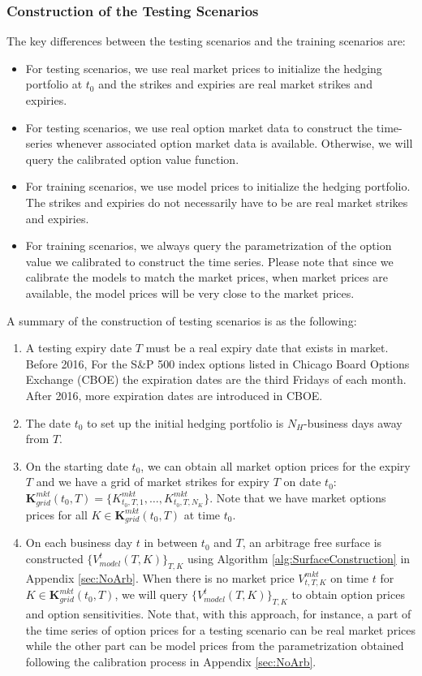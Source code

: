 \documentclass[letterpaper,12pt,titlepage,oneside,final]{book}
\numberwithin{equation}{section}
\theoremstyle{definition}
\begin{document}
\subsubsection{Construction of the Testing Scenarios}
\label{sec:AugTest}
The key differences between the testing scenarios and the training scenarios are:
\begin{itemize}
	\item  For testing scenarios, we use real market prices to initialize the hedging portfolio at $t_0$ and the strikes and expiries are real market strikes and expiries.
	\item  For testing scenarios, we use real option market data to construct the time-series whenever associated  option market data is available. Otherwise, we will query the calibrated option value function.
	\item For training scenarios, we use model prices to initialize the hedging portfolio. The strikes and expiries do not necessarily have to be are real market strikes and expiries.
	\item   For training scenarios, we always query the parametrization of the option value we calibrated to construct  the time series. Please note that  since we calibrate the models to match the market prices, when market prices are available, the model prices will be very close to the market prices. 
\end{itemize}
A summary of the construction of testing scenarios is as the following:
\begin{enumerate}
	\item A testing expiry date $T$ must be a real expiry date that exists in market. Before 2016, For the S\&P 500 index options listed in Chicago Board Options Exchange (CBOE) the expiration dates are the third Fridays of each month. After 2016, more expiration dates are introduced in CBOE.
	\item The date $t_0$ to set up the initial hedging portfolio is  $N_H$-business days away from $T$.
	\item On the starting date $t_0$, we can obtain all market option prices for the expiry  $T$ and we have a grid of market strikes for expiry $T$ on date $t_0$:
	$\mathbf{K}^{mkt}_{grid}(t _0,T)=\{	K^{mkt}_{t_0,T,1},\dots,K^{mkt}_{t_0,T,N_K}\}$. Note that we have market options  prices for all $K \in \mathbf{K}^{mkt}_{grid}(t _0,T)$ at time $t_0$.
	\item On each business day $t$ in between $t _0$ and $T$, an arbitrage free surface is constructed $\{V^{t}_{model}(T,K)\}_{T,K}$ using Algorithm \ref{alg:SurfaceConstruction} in Appendix \ref{sec:NoArb}. 
	When there is no  market price $V^{mkt}_{t,T,K}$ on time $t$ for $K \in \mathbf{K}^{mkt}_{grid}(t _0,T)$, we will query $\{V^{t}_{model}(T,K)\}_{T,K}$ to obtain  option prices and option sensitivities.  Note that, with this approach, for instance, a part  of the time series of option prices for a testing scenario can be real market prices while the other part can be model prices from the  parametrization  obtained following the calibration process in Appendix \ref{sec:NoArb}.
\end{enumerate}
\end{document}

